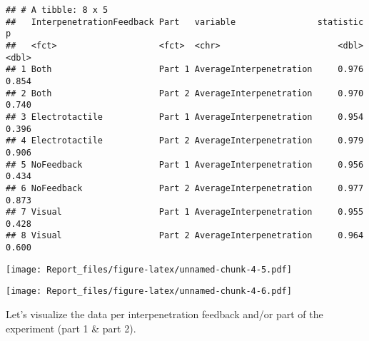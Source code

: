 \documentclass[
]{article}
\newenvironment{Shaded}{\begin{snugshade}}{\end{snugshade}}
\newcommand{\DataTypeTok}[1]{\textcolor[rgb]{0.13,0.29,0.53}{#1}}
\newcommand{\KeywordTok}[1]{\textcolor[rgb]{0.13,0.29,0.53}{\textbf{#1}}}
\newcommand{\NormalTok}[1]{#1}
\newcommand{\OperatorTok}[1]{\textcolor[rgb]{0.81,0.36,0.00}{\textbf{#1}}}
\newcommand{\StringTok}[1]{\textcolor[rgb]{0.31,0.60,0.02}{#1}}
\begin{document}
\begin{verbatim}
## # A tibble: 8 x 5
##   InterpenetrationFeedback Part   variable                statistic     p
##   <fct>                    <fct>  <chr>                       <dbl> <dbl>
## 1 Both                     Part 1 AverageInterpenetration     0.976 0.854
## 2 Both                     Part 2 AverageInterpenetration     0.970 0.740
## 3 Electrotactile           Part 1 AverageInterpenetration     0.954 0.396
## 4 Electrotactile           Part 2 AverageInterpenetration     0.979 0.906
## 5 NoFeedback               Part 1 AverageInterpenetration     0.956 0.434
## 6 NoFeedback               Part 2 AverageInterpenetration     0.977 0.873
## 7 Visual                   Part 1 AverageInterpenetration     0.955 0.428
## 8 Visual                   Part 2 AverageInterpenetration     0.964 0.600
\end{verbatim}

\begin{Shaded}
\end{Shaded}

\texttt{[image: Report\_files/figure-latex/unnamed-chunk-4-5.pdf]}

\begin{Shaded}
\end{Shaded}

\texttt{[image: Report\_files/figure-latex/unnamed-chunk-4-6.pdf]}

Let's visualize the data per interpenetration feedback and/or part of
the experiment (part 1 \& part 2).
\end{document}
